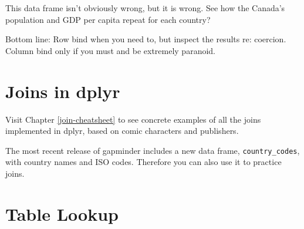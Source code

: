\documentclass[
]{book}
\newenvironment{Shaded}{\begin{snugshade}}{\end{snugshade}}
\newcommand{\CommentTok}[1]{\textcolor[rgb]{0.56,0.35,0.01}{\textit{#1}}}
\newcommand{\DecValTok}[1]{\textcolor[rgb]{0.00,0.00,0.81}{#1}}
\newcommand{\KeywordTok}[1]{\textcolor[rgb]{0.13,0.29,0.53}{\textbf{#1}}}
\newcommand{\NormalTok}[1]{#1}
\newcommand{\OperatorTok}[1]{\textcolor[rgb]{0.81,0.36,0.00}{\textbf{#1}}}
\newcommand{\StringTok}[1]{\textcolor[rgb]{0.31,0.60,0.02}{#1}}
\begin{document}
This data frame isn't obviously wrong, but it is wrong. See how the Canada's population and GDP per capita repeat for each country?

Bottom line: Row bind when you need to, but inspect the results re: coercion. Column bind only if you must and be extremely paranoid.

\hypertarget{joins-in-dplyr}{%
\section{Joins in dplyr}\label{joins-in-dplyr}}

Visit Chapter \ref{join-cheatsheet} to see concrete examples of all the joins implemented in dplyr, based on comic characters and publishers.

The most recent release of gapminder includes a new data frame, \texttt{country\_codes}, with country names and ISO codes. Therefore you can also use it to practice joins.

\begin{Shaded}
\end{Shaded}

\hypertarget{table-lookup}{%
\section{Table Lookup}\label{table-lookup}}
\end{document}
